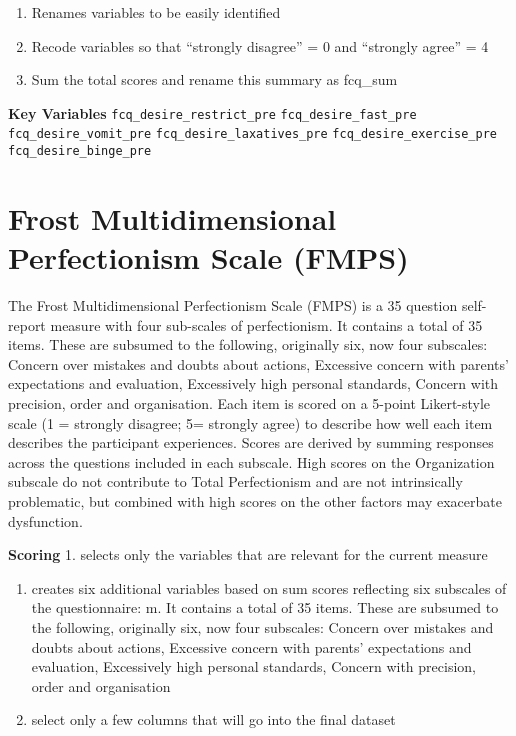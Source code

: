 \documentclass[
]{book}
\begin{document}
\begin{enumerate}
\def\labelenumi{\arabic{enumi}.}
\setcounter{enumi}{1}
\item
  Renames variables to be easily identified
\item
  Recode variables so that ``strongly disagree'' = 0 and ``strongly agree'' = 4
\item
  Sum the total scores and rename this summary as fcq\_sum
\end{enumerate}

\textbf{Key Variables}
\texttt{fcq\_desire\_restrict\_pre}
\texttt{fcq\_desire\_fast\_pre}
\texttt{fcq\_desire\_vomit\_pre}
\texttt{fcq\_desire\_laxatives\_pre}
\texttt{fcq\_desire\_exercise\_pre}
\texttt{fcq\_desire\_binge\_pre}

\hypertarget{frost-multidimensional-perfectionism-scale-fmps}{%
\section{Frost Multidimensional Perfectionism Scale (FMPS)}\label{frost-multidimensional-perfectionism-scale-fmps}}

The Frost Multidimensional Perfectionism Scale (FMPS) is a 35 question self-report measure with four sub-scales of perfectionism. It contains a total of 35 items. These are subsumed to the following, originally six, now four subscales: Concern over mistakes and doubts about actions, Excessive concern with parents' expectations and evaluation, Excessively high personal standards, Concern with precision, order and organisation. Each item is scored on a 5-point Likert-style scale (1 = strongly disagree; 5= strongly agree) to describe how well each item describes the participant experiences. Scores are derived by summing responses across the questions included in each subscale. High scores on the Organization subscale do not contribute to Total Perfectionism and are not intrinsically problematic, but combined with high scores on the other factors may exacerbate dysfunction.

\textbf{Scoring}
1. selects only the variables that are relevant for the current measure

\begin{enumerate}
\def\labelenumi{\arabic{enumi}.}
\setcounter{enumi}{1}
\item
  creates six additional variables based on sum scores reflecting six subscales of the questionnaire: m. It contains a total of 35 items. These are subsumed to the following, originally six, now four subscales: Concern over mistakes and doubts about actions, Excessive concern with parents' expectations and evaluation, Excessively high personal standards, Concern with precision, order and organisation
\item
  select only a few columns that will go into the final dataset
\end{enumerate}
\end{document}
